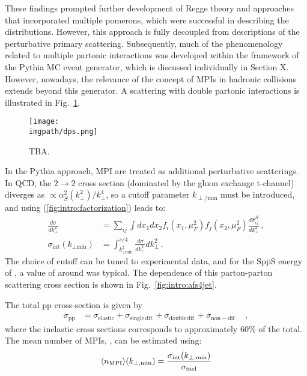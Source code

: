 These findings prompted further development of Regge theory and approaches that incorporated multiple pomerons, which were successful in describing the \Nch distributions. However, this approach is fully decoupled from descriptions of the perturbative primary scattering. Subsequently, much of the phenomenology related to multiple partonic interactions was developed within the framework of the Pythia MC event generator, which is discussed individually in Section X. However, nowadays, the relevance of the concept of MPIs in hadronic collisions extends beyond this generator. A scattering with double partonic interactions is illustrated in Fig.~\ref{fig:intro:dps}.

\begin{figure}[H]
\texttt{[image: \\imgpath/dps.png]}
\caption{TBA.}
\label{fig:intro:dps}
\end{figure}

In the Pythia approach, MPI are treated as additional perturbative scatterings. In QCD, the $2\to2$ cross section (dominated by the gluon exchange t-channel) diverges as $\propto \alpha^2_S(k_{\perp}^2)/k_{\perp}^4$, so a cutoff parameter $k_{\perp/\mathrm{min}}$ must be introduced, and using (\ref{fig:intro:factorization}) leads to:
\begin{align}
\frac{d\sigma}{dk_{\perp}^2} &= \sum_{ij}\int dx_1 dx_2 f_i(x_1,\mu_F^2)f_j(x_2,\mu_F^2) \frac{d\hat{\sigma}^H_{ij}}{dk_{\perp}^2} \, , \\
\sigma_{\text{int}}(k_{\perp\text{min}}) &= \int_{k_{\perp\text{min}}^2}^{s/4} \frac{d\sigma}{dk_{\perp}^2}dk_{\perp}^2 \, .
\end{align}
The choice of cutoff can be tuned to experimental data, and for the $\mathrm{Sp\bar{p}S}$ energy of , a value of around  was typical. The dependence of this parton-parton scattering cross section is shown in Fig.~\ref{fig:intro:afs4jet}.

The total pp cross-section is given by
\begin{align}
\sigma_{\mathrm{pp}} &= \sigma_{\mathrm{elastic}} + \sigma_{\mathrm{single \, dif.}} + \sigma_{\mathrm{double \, dif.}} + \sigma_{\mathrm{non-dif.}} \quad , 
\end{align}
where the inelastic cross sections corresponds to approximately 60\% of the total. The mean number of MPIs, \meannmpi, can be estimated using:
\begin{align}
\langle n_{\rm MPI} \rangle (k_{\perp,\mathrm{min}}) = \frac{\sigma_{\mathrm{int}}(k_{\perp,\mathrm{min}})}{\sigma_{\mathrm{inel}}}
\end{align}

